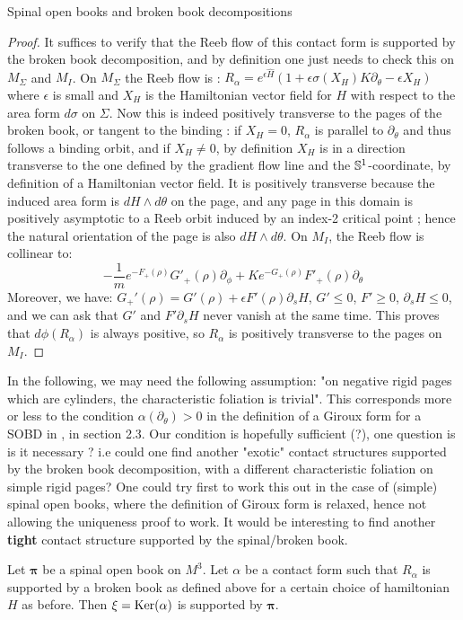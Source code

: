 \documentclass[../main.tex]{subfiles}
\begin{document}
\begin{section}{Spinal open books and broken book decompositions}
\begin{proof}
It suffices to verify that the Reeb flow of this contact form is supported by the broken book decomposition, and by definition one just needs to check this on $M_\Sigma$ and $M_I$. On $M_\Sigma$ the Reeb flow is : $R_\alpha = e^{\epsilon\hat{H} }(1+\epsilon\sigma(X_H)K\partial_\theta - \epsilon X_H)$ where $\epsilon$ is small and $X_H$ is the Hamiltonian vector field for $H$ with respect to the area form $d\sigma$ on $\Sigma$. Now this is indeed positively transverse to the pages of the broken book, or tangent to the binding : if $X_H = 0$, $R_\alpha$ is parallel to $\partial_\theta$ and thus follows a binding orbit, and if $X_H \neq 0$, by definition $X_H$ is in a direction transverse to the one defined by the gradient flow line and the $\mathbb{S}^1$-coordinate, by definition of a Hamiltonian vector field. It is positively transverse because the induced area form is $dH\wedge d\theta$ on the page, and any page in this domain is positively asymptotic to a Reeb orbit induced by an index-2 critical point ; hence the natural orientation of the page is also $dH\wedge d\theta$. On $M_I$, the Reeb flow is collinear to: $$-\frac{1}{m}e^{-F_+(\rho)}G'_+(\rho)\partial_\phi + Ke^{-G_+(\rho)}F'_+(\rho)\partial_\theta$$
Moreover, we have: $G_+'(\rho) = G'(\rho) +\epsilon F'(\rho)\partial_sH$, $G'\leq 0$, $F'\geq 0$, $\partial_s H\leq 0$, and we can ask that $G'$ and $F'\partial_sH$ never vanish at the same time. This proves that $d\phi(R_\alpha)$ is always positive, so $R_\alpha$ is positively transverse to the pages on $M_I$.
\end{proof}

\color{red}
In the following, we may need the following assumption: "on negative rigid pages which are cylinders, the characteristic foliation is trivial". This corresponds more or less to the condition $\alpha(\partial_\theta)>0$ in the definition of a Giroux form for a SOBD in \cite{SOBD1}, in section 2.3. Our condition is hopefully sufficient (?), one question is is it necessary ? i.e could one find another "exotic" contact structures supported by the broken book decomposition, with a different characteristic foliation on simple rigid pages? One could try first to work this out in the case of (simple) spinal open books, where the definition of Giroux form is relaxed, hence not allowing the uniqueness proof to work. It would be interesting to find another \textbf{tight} contact structure supported by the spinal/broken book.
\color{black}

\begin{lemma}\label{l:contact_BBD_to_SOBD}
Let $\boldsymbol{\pi}$ be a spinal open book on $M^3$. Let $\alpha$ be a contact form such that $R_\alpha$ is supported by a broken book as defined above for a certain choice of hamiltonian $H$ as before. Then $\xi = \text{Ker}(\alpha)$ is supported by $\boldsymbol{\pi}$. 
\end{lemma}


\end{section}
\end{document}

